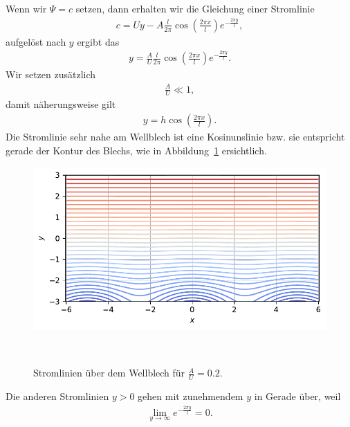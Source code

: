Wenn wir $\Psi = c$ setzen, dann erhalten wir die Gleichung
einer Stromlinie
\begin{align}
    c = U y - A \frac{l}{2 \pi} 
    \cos\left(\frac{2 \pi x}{l}\right) 
    e^{-\frac{2 \pi y}{l}},\label{eq:stromlinie}
\end{align}
aufgelöst nach $y$ ergibt das
\begin{align*}
    y
    =
    \frac{A}{U} \frac{l}{2 \pi} 
    \cos\left(\frac{2 \pi x}{l}\right) 
    e^{-\frac{2 \pi y}{l}}.
\end{align*}
Wir setzen zusätzlich 
\begin{align*}
    \frac{A}{U} \ll 1,
\end{align*}
damit näherungsweise gilt
\begin{align*}
    y
    =
    h \cos\left(\frac{2 \pi x}{l}\right).
\end{align*}
Die Stromlinie sehr nahe am Wellblech ist eine
Kosinunslinie bzw. sie entspricht gerade der Kontur
des Blechs, wie in Abbildung~\ref{fig:stromlinien} ersichtlich.
\begin{figure}
    \centering
    \includegraphics[width=\textwidth]{papers/ueberschall/figures/Stromlinien.pdf}
    \caption{Stromlinien über dem Wellblech für $\frac{A}{U}=0.2$.}
    ~\label{fig:stromlinien}  
\end{figure}
Die anderen Stromlinien $y > 0$ gehen mit zunehmendem $y$
in Gerade über, weil
\begin{align*}
    \lim_{y \to \infty}
    e^{-\frac{2 \pi y}{l}}
    =
    0.
\end{align*}

